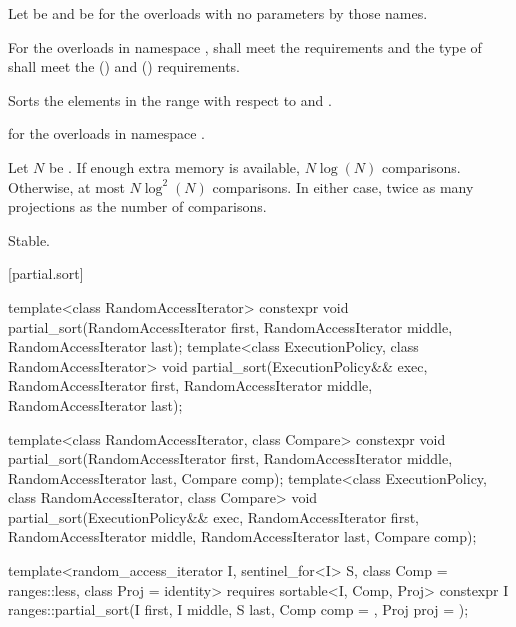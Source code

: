 \begin{itemdescr}
\pnum
Let  be 
and  be 
for the overloads with no parameters by those names.

\pnum
\requires
For the overloads in namespace ,
 shall meet
the  requirements and
the type of  shall meet
the  () and
 () requirements.

\pnum
\effects
Sorts the elements in the range 
with respect to  and .

\pnum
\returns
{} for the overloads in namespace .

\pnum
\complexity
Let $N$ be .
If enough extra memory is available, $N \log(N)$ comparisons.
Otherwise, at most $N \log^2(N)$ comparisons.
In either case, twice as many projections as the number of comparisons.

\pnum
\remarks
Stable.
\end{itemdescr}

[partial.sort]{}

%
\begin{itemdecl}
template<class RandomAccessIterator>
  constexpr void partial_sort(RandomAccessIterator first,
                              RandomAccessIterator middle,
                              RandomAccessIterator last);
template<class ExecutionPolicy, class RandomAccessIterator>
  void partial_sort(ExecutionPolicy&& exec,
                    RandomAccessIterator first,
                    RandomAccessIterator middle,
                    RandomAccessIterator last);

template<class RandomAccessIterator, class Compare>
  constexpr void partial_sort(RandomAccessIterator first,
                              RandomAccessIterator middle,
                              RandomAccessIterator last,
                              Compare comp);
template<class ExecutionPolicy, class RandomAccessIterator, class Compare>
  void partial_sort(ExecutionPolicy&& exec,
                    RandomAccessIterator first,
                    RandomAccessIterator middle,
                    RandomAccessIterator last,
                    Compare comp);

template<random_access_iterator I, sentinel_for<I> S, class Comp = ranges::less,
         class Proj = identity>
  requires sortable<I, Comp, Proj>
  constexpr I
    ranges::partial_sort(I first, I middle, S last, Comp comp = {}, Proj proj = {});
\end{itemdecl}

